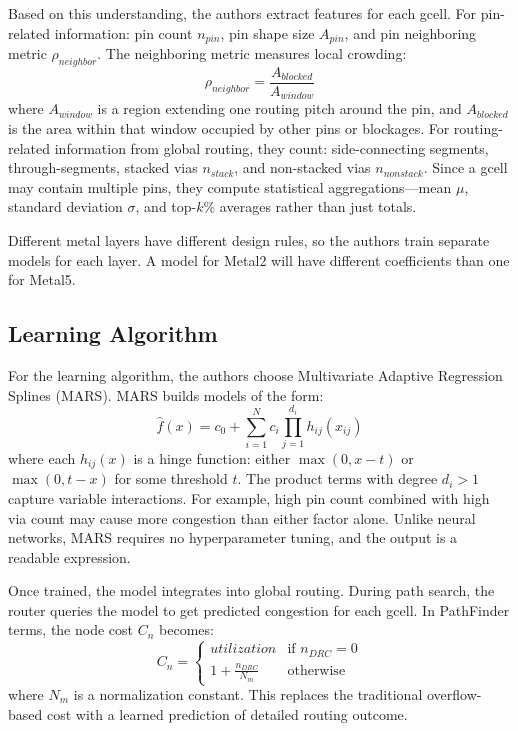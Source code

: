 \documentclass[sigconf]{acmart}
\begin{document}
Based on this understanding, the authors extract features for each
gcell. For pin-related information: pin count $n_{pin}$, pin shape
size $A_{pin}$, and pin neighboring metric $\rho_{neighbor}$. The
neighboring metric measures local crowding:
\begin{equation}
\rho_{neighbor} = \frac{A_{blocked}}{A_{window}}
\end{equation}
where $A_{window}$ is a region extending one routing pitch around the
pin, and $A_{blocked}$ is the area within that window occupied by
other pins or blockages. For routing-related information from global
routing, they count: side-connecting segments, through-segments,
stacked vias $n_{stack}$, and non-stacked vias $n_{nonstack}$. Since
a gcell may contain multiple pins, they compute statistical
aggregations—mean $\mu$, standard deviation $\sigma$, and top-$k$\%
averages rather than just totals.

Different metal layers have different design rules, so the authors
train separate models for each layer. A model for Metal2 will have
different coefficients than one for Metal5.

\subsection{Learning Algorithm}

For the learning algorithm, the authors choose Multivariate Adaptive
Regression Splines (MARS). MARS builds models of the form:
\begin{equation}
\hat{f}(x) = c_0 + \sum_{i=1}^{N} c_i \prod_{j=1}^{d_i} h_{ij}(x_{ij})
\end{equation}
where each $h_{ij}(x)$ is a hinge function: either $\max(0, x - t)$
or $\max(0, t - x)$ for some threshold $t$. The product terms with
degree $d_i > 1$ capture variable interactions. For example, high
pin count combined with high via count may cause more congestion
than either factor alone. Unlike neural networks, MARS requires no
hyperparameter tuning, and the output is a readable expression.

Once trained, the model integrates into global routing. During path
search, the router queries the model to get predicted congestion for
each gcell. In PathFinder terms, the node cost $C_n$ becomes:
\begin{equation}
C_n = \begin{cases}
utilization & \text{if } n_{DRC} = 0 \\
1 + \frac{n_{DRC}}{N_m} & \text{otherwise}
\end{cases}
\end{equation}
where $N_m$ is a normalization constant. This replaces the traditional
overflow-based cost with a learned prediction of detailed routing outcome.
\end{document}
